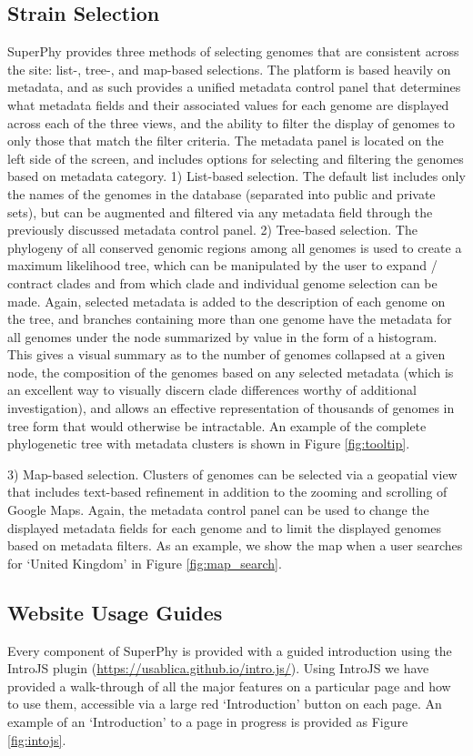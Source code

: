 \documentclass[doublespacing, linenumbers]{bmcart}
\begin{document}
\subsection{Strain Selection}
SuperPhy provides three methods of selecting genomes that are consistent across the site: list-, tree-, and map-based selections. The platform is based heavily on metadata, and as such provides a unified metadata control panel that determines what metadata fields and their associated values for each genome are displayed across each of the three views, and the ability to filter the display of genomes to only those that match the filter criteria. The metadata panel is located on the left side of the screen, and includes options for selecting and filtering the genomes based on metadata category.
 1) List-based selection. The default list includes only the names of the genomes in the database (separated into public and private sets), but can be augmented and filtered via any metadata field through the previously discussed metadata control panel.
 2) Tree-based selection. The phylogeny of all conserved genomic regions among all genomes is used to create a maximum likelihood tree, which can be manipulated by the user to expand / contract clades and from which clade and individual genome selection can be made. Again, selected metadata is added to the description of each genome on the tree, and branches containing more than one genome have the metadata for all genomes under the node summarized by value in the form of a histogram. This gives a visual summary as to the number of genomes collapsed at a given node, the composition of the genomes based on any selected metadata (which is an excellent way to visually discern clade differences worthy of additional investigation), and allows an effective representation of thousands of genomes in tree form that would otherwise be intractable. An example of the complete phylogenetic tree with metadata clusters is shown in Figure \ref{fig:tooltip}.


 3) Map-based selection. Clusters of genomes can be selected via a geopatial view that includes text-based refinement in addition to the zooming and scrolling of Google Maps. Again, the metadata control panel can be used to change the displayed metadata fields for each genome and to limit the displayed genomes based on metadata filters. As an example, we show the map when a user searches for `United Kingdom' in Figure \ref{fig:map_search}.

\subsection{Website Usage Guides}
Every component of SuperPhy is provided with a guided introduction using the IntroJS plugin (\url{https://usablica.github.io/intro.js/}). Using IntroJS we have provided a walk-through of all the major features on a particular page and how to use them, accessible via a large red `Introduction' button on each page. An example of an `Introduction' to a page in progress is provided as Figure \ref{fig:intojs}.
\end{document}
